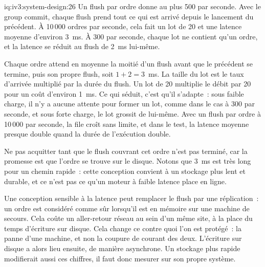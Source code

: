 \begin{solution}{iq:iv3:system-design:26}
Un flush par ordre donne au plus 500 par seconde. Avec le group commit, chaque flush prend tout ce qui est arrivé depuis le lancement du précédent. À 10\,000 ordres par seconde, cela fait un lot de 20 et une latence moyenne d'environ 3~ms. À 300 par seconde, chaque lot ne contient qu'un ordre, et la latence se réduit au flush de 2~ms lui-même.
\enlargethispage{-3\baselineskip}%
\label{lst:iv3:sd:group}

Chaque ordre attend en moyenne la moitié d'un flush avant que le précédent se termine, puis son propre flush, soit $1 + 2 = 3$~ms. La taille du lot est le taux d'arrivée multiplié par la durée du flush. Un lot de 20 multiplie le débit par 20 pour un coût d'environ 1~ms. Ce qui séduit, c'est qu'il s'adapte~: sous faible charge, il n'y a aucune attente pour former un lot, comme dans le cas à 300 par seconde, et sous forte charge, le lot grossit de lui-même. Avec un flush par ordre à 10\,000 par seconde, la file croît sans limite, et dans le test, la latence moyenne presque double quand la durée de l'exécution double.

Ne pas acquitter tant que le flush couvrant cet ordre n'est pas terminé, car la promesse est que l'ordre se trouve sur le disque. Notons que 3~ms est très long pour un chemin rapide~: cette conception convient à un stockage plus lent et durable, et ce n'est pas ce qu'un moteur à faible latence place en ligne.

Une conception sensible à la latence peut remplacer le flush par une réplication~: un ordre est considéré comme sûr lorsqu'il est en mémoire sur une machine de secours. Cela coûte un aller-retour réseau au sein d'un même site, à la place du temps d'écriture sur disque. Cela change ce contre quoi l'on est protégé~: la panne d'une machine, et non la coupure de courant des deux. L'écriture sur disque a alors lieu ensuite, de manière asynchrone. Un stockage plus rapide modifierait aussi ces chiffres, il faut donc mesurer sur son propre système.

\end{solution}

